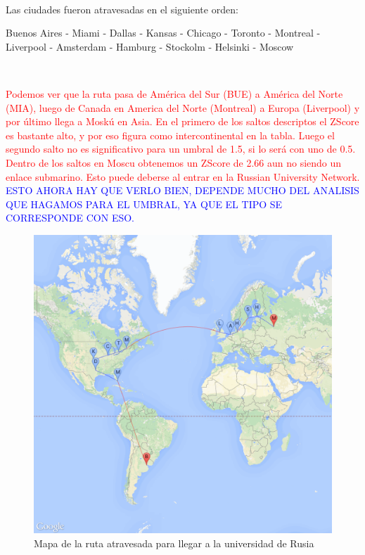 ~

Las ciudades fueron atravesadas en el siguiente orden:

Buenos Aires - Miami - Dallas - Kansas - Chicago - Toronto - Montreal - Liverpool - Amsterdam -
Hamburg - Stockolm - Helsinki - Moscow

~

\textcolor{red}{Podemos ver que la ruta pasa de Am\'erica del Sur (BUE) a Am\'erica del Norte (MIA), luego de Canada en America del Norte (Montreal) a Europa (Liverpool) y por \'ultimo llega a Mosk\'u en Asia. En el primero de los saltos descriptos el ZScore es bastante alto, y por eso figura como intercontinental en la tabla.
Luego el segundo salto no es significativo para un umbral de 1.5, si lo ser\'a con uno de 0.5.
Dentro de los saltos en Moscu obtenemos un ZScore de 2.66 aun no siendo un enlace submarino. Esto puede deberse al entrar en la Russian University Network.}
\textcolor{blue}{ESTO AHORA HAY QUE VERLO BIEN, DEPENDE MUCHO DEL ANALISIS QUE HAGAMOS PARA EL UMBRAL, YA QUE EL TIPO SE CORRESPONDE CON ESO.}

\begin{figure}[H]
	\begin{center}
		  \includegraphics[scale=0.25]{../results/maps/MSU.png}
		  \caption{Mapa de la ruta atravesada para llegar a la universidad de Rusia}
	\end{center}
\end{figure}

